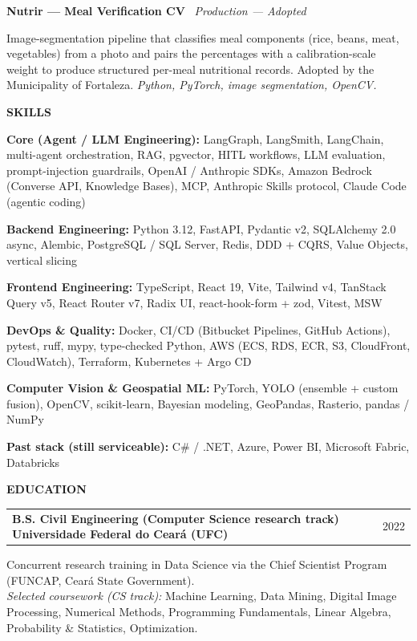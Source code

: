 \documentclass[10pt,a4paper]{article}
\makeatletter
\renewcommand{\section}[1]{%
  \par\vspace{10pt}%
  {\large\bfseries\color{accent}\MakeUppercase{#1}}\par%
  \vspace{2pt}%
  \noindent{\color{rule}\rule{\linewidth}{0.6pt}}\par%
  \vspace{2pt}%
}
\newcommand{\job}[3]{%
  \par\vspace{4pt}%
  \noindent\begin{tabularx}{\linewidth}{@{}X r@{}}%
    \textbf{#1} \, {\color{accent}\textbf{#2}} & {\small\color{muted}#3} \\
  \end{tabularx}%
  \vspace{1pt}%
}
\newcommand{\project}[2]{%
  \par\vspace{3pt}%
  \noindent\textbf{#1} \, {\small\color{muted}\textit{#2}}\par%
}
\newcommand{\skillrow}[2]{%
  \noindent\textbf{#1:} #2\par\vspace{2pt}%
}
\makeatother
\begin{document}
\project{Nutrir --- Meal Verification CV}{Production --- Adopted}
Image-segmentation pipeline that classifies meal components (rice, beans, meat, vegetables) from a photo and pairs the percentages with a calibration-scale weight to produce structured per-meal nutritional records. Adopted by the Municipality of Fortaleza. \textit{\small Python, PyTorch, image segmentation, OpenCV.}

\section{Skills}

\skillrow{Core (Agent / LLM Engineering)}{LangGraph, LangSmith, LangChain, multi-agent orchestration, RAG, pgvector, HITL workflows, LLM evaluation, prompt-injection guardrails, OpenAI / Anthropic SDKs, Amazon Bedrock (Converse API, Knowledge Bases), MCP, Anthropic Skills protocol, Claude Code (agentic coding)}
\skillrow{Backend Engineering}{Python 3.12, FastAPI, Pydantic v2, SQLAlchemy 2.0 async, Alembic, PostgreSQL / SQL Server, Redis, DDD + CQRS, Value Objects, vertical slicing}
\skillrow{Frontend Engineering}{TypeScript, React 19, Vite, Tailwind v4, TanStack Query v5, React Router v7, Radix UI, react-hook-form + zod, Vitest, MSW}
\skillrow{DevOps \& Quality}{Docker, CI/CD (Bitbucket Pipelines, GitHub Actions), pytest, ruff, mypy, type-checked Python, AWS (ECS, RDS, ECR, S3, CloudFront, CloudWatch), Terraform, Kubernetes + Argo CD}
\skillrow{Computer Vision \& Geospatial ML}{PyTorch, YOLO (ensemble + custom fusion), OpenCV, scikit-learn, Bayesian modeling, GeoPandas, Rasterio, pandas / NumPy}
\skillrow{Past stack (still serviceable)}{C\# / .NET, Azure, Power BI, Microsoft Fabric, Databricks}

\section{Education}

\job{B.S. Civil Engineering (Computer Science research track)}{Universidade Federal do Cear\'a (UFC)}{2022}
Concurrent research training in Data Science via the Chief Scientist Program (FUNCAP, Cear\'a State Government).\\
\textit{\small Selected coursework (CS track):} Machine Learning, Data Mining, Digital Image Processing, Numerical Methods, Programming Fundamentals, Linear Algebra, Probability \& Statistics, Optimization.
\end{document}
